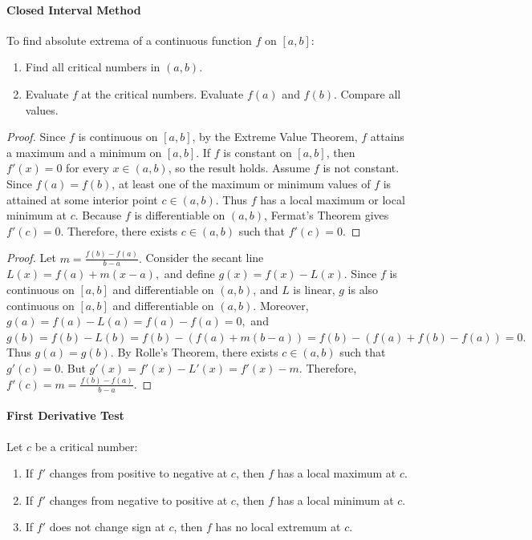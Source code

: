 \documentclass[oneside]{book}
\begin{document}
\paragraph{Closed Interval Method}{
To find absolute extrema of a continuous function $f$ on $[a,b]$:
\begin{enumerate}
    \item Find all critical numbers in $(a,b)$.
    \item Evaluate $f$ at the critical numbers. Evaluate $f(a)$ and $f(b)$. Compare all values.
\end{enumerate}
}


\begin{proof}
\noindent Since \(f\) is continuous on \([a,b]\), by the Extreme Value Theorem,
\(f\) attains a maximum and a minimum on \([a,b]\). If \(f\) is constant on \([a,b]\), then \(f'(x)=0\) for every
\(x\in(a,b)\), so the result holds. Assume \(f\) is not constant. Since \(f(a)=f(b)\), at least one of the
maximum or minimum values of \(f\) is attained at some interior point
\(c\in(a,b)\). Thus \(f\) has a local maximum or local minimum at \(c\). Because \(f\) is differentiable on \((a,b)\), Fermat's Theorem gives
$
f'(c)=0.
$
Therefore, there exists \(c\in(a,b)\) such that
$
f'(c)=0.
$
\end{proof}


\begin{proof}
Let
$
m=\frac{f(b)-f(a)}{b-a}.
$
Consider the secant line
$
L(x)=f(a)+m(x-a),
$
and define
$
g(x)=f(x)-L(x).
$
Since \(f\) is continuous on \([a,b]\) and differentiable on \((a,b)\), and \(L\) is linear, \(g\) is also continuous on \([a,b]\) and differentiable on \((a,b)\). Moreover,
$
g(a)=f(a)-L(a)=f(a)-f(a)=0,
$
and
$
g(b)=f(b)-L(b)
=f(b)-\left(f(a)+m(b-a)\right)
=f(b)-\left(f(a)+f(b)-f(a)\right)=0.
$
Thus \(g(a)=g(b)\). By Rolle's Theorem, there exists \(c\in(a,b)\) such that
$
g'(c)=0.
$
But
$
g'(x)=f'(x)-L'(x)=f'(x)-m.
$
Therefore,
$
f'(c)=m=\frac{f(b)-f(a)}{b-a}.
$
\end{proof}

\paragraph{First Derivative Test}{
Let $c$ be a critical number: 
\begin{enumerate}
    \item If $f'$ changes from positive to negative at $c$, then $f$ has a local maximum at $c$.
    \item If $f'$ changes from negative to positive at $c$, then $f$ has a local minimum at $c$.
    \item If $f'$ does not change sign at $c$, then $f$ has no local extremum at $c$.
\end{enumerate}
}
\end{document}
